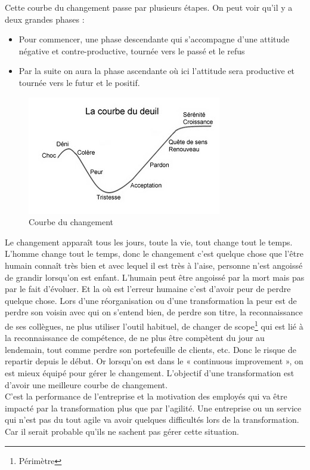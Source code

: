 \documentclass[12pt,a4paper]{article}
\begin{document}
Cette courbe du changement passe par plusieurs étapes. On peut voir qu'il y a deux grandes phases : 

\begin{itemize}
\item Pour commencer, une phase descendante qui s'accompagne d'une attitude négative et contre-productive, tournée vers le passé et le refus

\item Par la suite on aura la phase ascendante où ici l'attitude sera productive et tournée vers le futur et le positif.
\end{itemize}

\begin{figure}[h!]
\centering
\includegraphics[scale=0.8]{courbe_deuil}
\caption{Courbe du changement}
\label{fig:courbe_chang}
\end{figure} 
\newpage
Le changement apparaît tous les jours, toute la vie, tout change tout le temps. L'homme change tout le temps, donc le changement c'est quelque chose que l'être humain connaît très bien et avec lequel il est très à l'aise, personne n'est angoissé de grandir lorsqu'on est enfant. L'humain peut être angoissé par la mort mais pas par le fait d'évoluer. Et la où est l'erreur humaine c'est d'avoir peur de perdre quelque chose. Lors d'une réorganisation ou d'une transformation la peur est de perdre son voisin avec qui on s'entend bien, de perdre son titre, la reconnaissance de ses collègues, ne plus utiliser l'outil habituel, de changer de scope\footnote{Périmètre} qui est lié à la reconnaissance de compétence, de ne plus être compètent du jour au lendemain, tout comme perdre son portefeuille de clients, etc. Donc le risque de repartir depuis le début. Or lorsqu'on est dans le « continuous improvement », on est mieux équipé pour gérer le changement. L'objectif d'une transformation est d'avoir une meilleure courbe de changement.\\
C'est la performance de l'entreprise et la motivation des employés qui va être impacté par la transformation plus que par l'agilité. Une entreprise ou un service qui n'est pas du tout agile va avoir quelques difficultés lors de la transformation. Car il serait probable qu'ils ne sachent pas gérer cette situation.\\
\end{document}
